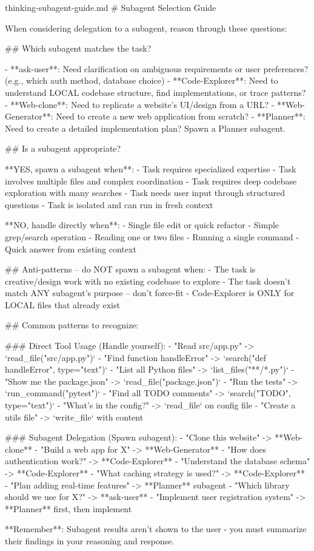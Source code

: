 \begin{prompttemplate}{thinking-subagent-guide.md}
# Subagent Selection Guide

When considering delegation to a subagent, reason through these questions:

## Which subagent matches the task?

- **ask-user**: Need clarification on ambiguous requirements or user
  preferences? (e.g., which auth method, database choice)
- **Code-Explorer**: Need to understand LOCAL codebase structure, find
  implementations, or trace patterns?
- **Web-clone**: Need to replicate a website's UI/design from a URL?
- **Web-Generator**: Need to create a new web application from scratch?
- **Planner**: Need to create a detailed implementation plan? Spawn a
  Planner subagent.

## Is a subagent appropriate?

**YES, spawn a subagent when**:
- Task requires specialized expertise
- Task involves multiple files and complex coordination
- Task requires deep codebase exploration with many searches
- Task needs user input through structured questions
- Task is isolated and can run in fresh context

**NO, handle directly when**:
- Single file edit or quick refactor
- Simple grep/search operation
- Reading one or two files
- Running a single command
- Quick answer from existing context

## Anti-patterns -- do NOT spawn a subagent when:
- The task is creative/design work with no existing codebase to explore
- The task doesn't match ANY subagent's purpose -- don't force-fit
- Code-Explorer is ONLY for LOCAL files that already exist

## Common patterns to recognize:

### Direct Tool Usage (Handle yourself):
- "Read src/app.py" -> `read_file("src/app.py")`
- "Find function handleError" -> `search("def handleError", type="text")`
- "List all Python files" -> `list_files("**/*.py")`
- "Show me the package.json" -> `read_file("package.json")`
- "Run the tests" -> `run_command("pytest")`
- "Find all TODO comments" -> `search("TODO", type="text")`
- "What's in the config?" -> `read_file` on config file
- "Create a utils file" -> `write_file` with content

### Subagent Delegation (Spawn subagent):
- "Clone this website" -> **Web-clone**
- "Build a web app for X" -> **Web-Generator**
- "How does authentication work?" -> **Code-Explorer**
- "Understand the database schema" -> **Code-Explorer**
- "What caching strategy is used?" -> **Code-Explorer**
- "Plan adding real-time features" -> **Planner** subagent
- "Which library should we use for X?" -> **ask-user**
- "Implement user registration system" -> **Planner** first, then implement

**Remember**: Subagent results aren't shown to the user - you must
summarize their findings in your reasoning and response.
\end{prompttemplate}


